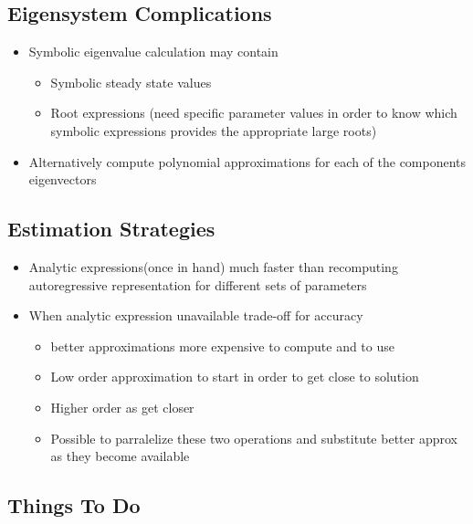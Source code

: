\documentclass[12pt]{elsart}
\begin{document}
  \subsection{Eigensystem Complications}
  \begin{itemize}
  \item Symbolic eigenvalue calculation may contain
    \begin{itemize}
    \item Symbolic steady state values
    \item Root expressions (need specific parameter values in order to know which symbolic expressions provides the appropriate large roots)
    \end{itemize}
  \item Alternatively compute polynomial approximations 
for each of the components eigenvectors
  \end{itemize}







  \subsection{Estimation Strategies }
  \begin{itemize}
  \item Analytic expressions(once in hand) much faster than recomputing autoregressive representation for different sets of parameters

  \item When analytic expression unavailable trade-off for accuracy
    \begin{itemize}
    \item better approximations more expensive to compute and to use
    \item Low order approximation to start in order to get close to solution
    \item Higher order as get closer
    \item Possible to parralelize these two operations and substitute better approx as they become available
    \end{itemize}
  \end{itemize}







  \subsection{Things To Do}
\end{document}
